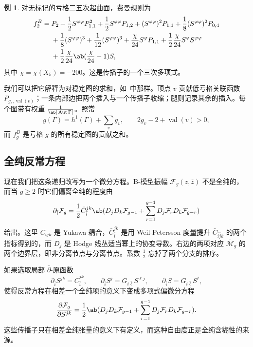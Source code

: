 \documentclass{amsart}
\theoremstyle{definition}
\newtheorem{exm}[thm]{例}
\theoremstyle{remark}
\theoremstyle{plain}
\theoremstyle{definition}
\theoremstyle{remark}
\newcommand{\Mbar}{\overline{\mathcal{M}}}
\newcommand{\mc}[1]{\mathcal{#1}}
\newcommand{\on}[1]{\operatorname{#1}}
\newcommand{\1}{\mathbf{1}}
\newcommand{\2}{\mathbf{2}}
\newcommand{\3}{\mathbf{3}}
\DeclareMathOperator{\Aut}{Aut}
\begin{document}
\begin{exm}
    对无标记的亏格二五次超曲面，费曼规则为
    \begin{align*}
        f_2^B ={}& P_2 + \frac{1}{2}S^{\varphi\varphi}P_{1,1}^2 + \frac{1}{2}S^{\varphi\varphi}P_{1,2} + (S^{\varphi\varphi})^2 P_{1,1} + \frac{1}{8}(S^{\varphi\varphi})^2 P_{0,4} \\
        &+ \frac{1}{8}(S^{\varphi\varphi})^3 + \frac{1}{12}(S^{\varphi\varphi})^3 + \frac{\chi}{24}S^{\varphi}P_{1,1} + \frac{1}{2}\frac{\chi}{24}S^{\varphi}S^{\varphi\varphi} \\
        &+ \frac{1}{2}\frac{\chi}{24}\ab(\frac{\chi}{24}-1)S,
    \end{align*}
    其中 \(\chi = \chi(X_5) = -200\)。这是传播子的一个三次多项式。
\end{exm}

我们可以把它解释为对稳定图的求和，如~中那样。顶点 \(v\) 贡献低亏格关联函数 \(P_{g_v, \on{val}(v)}\)；一条内部边把两个插入与一个传播子收缩；腿则记录其余的插入。每个图带有权重 \(\frac{1}{\ab|\Aut \Gamma|}\)。照常
\[ g(\Gamma) = h^1(\Gamma) + \sum_v g_v, \qquad 2g_v - 2 + \on{val}(v) > 0, \]
而 \(f_g^B\) 是亏格 \(g\) 的所有稳定图的贡献之和。

\subsection{全纯反常方程}%
\label{sub:The holomorphic anomaly equation}

现在我们把这条递归改写为一个微分方程。B-模型振幅 \(\mc{F}_g(z,\bar{z})\) 不是全纯的，而当 \(g \geq 2\) 时它们偏离全纯的程度由
\[ \partial_{\bar{i}} \mc{F}_g = \frac{1}{2}\bar{C}_{\bar{i}}^{jk}\ab( D_j D_k \mc{F}_{g-1} + \sum_{r=1}^{g-1} D_j \mc{F}_r D_k \mc{F}_{g-r} ) \]
给出。这里 \(C_{ijk}\) 是 Yukawa 耦合，\(\bar{C}_{\bar{i}}^{jk}\) 是用 Weil-Petersson 度量提升 \(\bar{C}_{\bar{i}\bar{j}\bar{k}}\) 的两个指标得到的，而 \(D_j\) 是 Hodge 线丛适当幂上的协变导数。右边的两项对应 \(\Mbar_g\) 的两个边界层，即非分离节点与分离节点。系数 \(\frac{1}{2}\) 忘掉了两个分支的排序。

如果选取局部 \(\bar{\partial}\)-原函数
\[ \partial_{\bar{i}}S^{jk} = \bar{C}_{\bar{i}}^{jk}, \qquad \partial_{\bar{i}}S^j = G_{i\bar{\ell}}S^{\ell j}, \qquad \partial_{\bar{i}}S = G_{i\bar{\ell}}S^{\ell}, \]
使得反常方程在相差一个全纯项的意义下变成多项式偏微分方程
\[ \pdv{\mc{F}_g}{S^{jk}} = \frac{1}{2}\ab( D_jD_k \mc{F}_{g-1} + \sum_{r=1}^{g-1} D_j \mc{F}_r D_k \mc{F}_{g-r} ). \]
这些传播子只在相差全纯张量的意义下有定义，而这种自由度正是全纯含糊性的来源。
\end{document}
